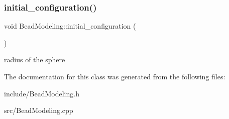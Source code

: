 \subsubsection{\texorpdfstring{initial\_configuration()}{initial\_configuration()}}
{\footnotesize\ttfamily void Bead\+Modeling\+::initial\+\_\+configuration (\begin{DoxyParamCaption}{ }\end{DoxyParamCaption})}

radius of the sphere 

The documentation for this class was generated from the following files\+:\begin{DoxyCompactItemize}
\item 
include/Bead\+Modeling.\+h\item 
src/Bead\+Modeling.\+cpp\end{DoxyCompactItemize}
